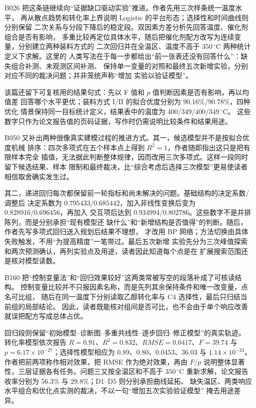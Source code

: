 B026 把这条链继续向“证据缺口驱动实验”推进。作者先用三次样条统一温度水平，
再从散点趋势和转化率上界说明 Logistic 的平台形态；选择性和时间曲线则分别保留
二次关系与分段下降后的稳定段。双因素方差分析先回答温度、催化剂组合是否有影响，
多重比较再定位具体水平，随后把催化剂配方改写为连续变量，分别建立两种装料方式的
二次回归并在全温区、温度不高于 $350\,^{\circ}\mathrm{C}$ 两种统计定义下求解。这里的
人类写法在于每一步都给出“前一张表还没有回答什么”：缺失组合补测、未观测区间补测、
保持单一变量的对照和最终五次新增实验，分别对应不同的裁决问题；并非笼统声称“增加
实验以验证模型”。

该篇还留下可复核用的结果句式：先以 F 值和 $p$ 值判断因素是否有影响，再以均值差
回答哪个水平更优；装料方式 I/II 的拟合优度分别为 $90.16\%/90.78\%$，四种优化
情景保持同一目标统计定义，结果表中的温度为 $400/349/400/349\,^{\circ}\mathrm{C}$。
这些数字只作为论文报告值的页码证据，写作时仍需说明比较条件和结果用途。

B050 又补出两种很像真实建模过程的推进方式。其一，候选模型并不是按拟合优度机械
排序：四次多项式在五个样本点上得到 $R^2=1$，作者随即指出这只是把有限样本完全
插值，无法据此判断整体规律，因而改用三次多项式。这样一段同时留下候选结果、样本
限制和最终裁决，比“综合考虑后选择三次模型”更易使读者相信取舍确实发生过。

其二，递进回归每次都保留前一轮指标和尚未解决的问题。基础结构的决定系数/调整后
决定系数为 $0.795433/0.685442$，加入非线性变换后变为 $0.828916/0.696456$，再加入
交互项后达到 $0.934994/0.802786$。这些数字不是并排陈列，而是分别承担“现有模型还
缺什么”和“新增结构是否值得”的判断。随后，作者先写多项式回归送入规划后结果不理想，
才改用 BP 网络；方法切换由具体失败触发，不用“为提高精度”一笔带过。最后五次新增
实验先分为三次峰值探索和两次预测确认，再列实验点及用途，读者因此知道每个点是在
扩展搜索范围还是核对模型读数。

B160 把“控制变量法”和“回归效果较好”这两类常被写空的段落补成了可核读结构。
控制变量比较并不只报因素名称，而是先列其余保持条件和唯一改变量，点名可比组，
随后在同一温度下分别读取乙醇转化率与 C4 选择性，最后只归结当前组的局部结论。
因此，读者既能核对组间是否可比，也不会由于单个响应改善就误把配方写成总体占优。

回归段则保留“初始模型--诊断图--多重共线性--逐步回归--修正模型”的真实轨迹。
转化率模型依次报告 $R=0.91$、$R^2=0.832$、$RMSE=0.0417$、$F=39.74$ 与
$p=6.17\times10^{-27}$；选择性模型相应为 $0.89$、$0.80$、$0.0453$、$36.03$ 与
$1.14\times10^{-24}$。作者把前两项称作相对效果，把 RMSE 作为绝对效果，再由 $F/p$
说明整体显著性，三层证据各有任务。问题三又按全温区和不高于 $350\,^{\circ}\mathrm{C}$
重新求解，论文报告收率分别为 $56.3\%$ 与 $29.8\%$；D1--D5 则分别承担曲线延拓、
缺失温区、两类响应水平组合和优化点实测的裁决，不以一句“增加五次实验验证模型”
掩去用途差异。

